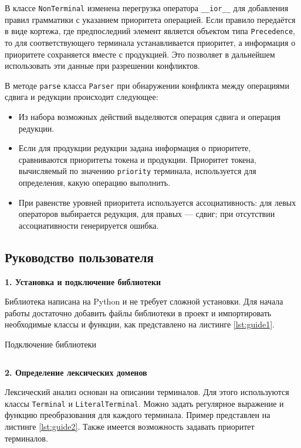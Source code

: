 \documentclass[14pt, russian]{scrartcl}
\begin{document}
В классе \texttt{NonTerminal} изменена перегрузка оператора \texttt{\_\_ior\_\_} для добавления правил
грамматики с указанием приоритета операцией.
Если правило передаётся в виде кортежа, где предпоследний элемент является объектом типа \texttt{Precedence},
то для соответствующего терминала устанавливается приоритет, а информация о приоритете сохраняется вместе с
продукцией. Это позволяет в дальнейшем использовать эти данные при разрешении конфликтов.

В методе \texttt{parse} класса \texttt{Parser} при обнаружении конфликта между операциями сдвига и редукции
происходит следующее:
\begin{itemize}
	\item Из набора возможных действий выделяются операция сдвига и операция редукции.
	\item Если для продукции редукции задана информация о приоритете, сравниваются приоритеты токена и
	продукции. Приоритет токена, вычисляемый по значению \texttt{priority} терминала, используется для
	определения, какую операцию выполнить.
	\item При равенстве уровней приоритета используется ассоциативность: для левых операторов выбирается
	редукция, для правых --- сдвиг; при отсутствии ассоциативности генерируется ошибка.
\end{itemize}


\subsection{Руководство пользователя}

\textbf{1. Установка и подключение библиотеки}

Библиотека написана на Python и не требует сложной установки. Для начала работы достаточно добавить файлы
библиотеки в проект и импортировать необходимые классы и функции, как представлено на листинге \ref{lst:guide1}.

\begin{listing}[H]
	\caption{Подключение библиотеки}
	\label{lst:guide1}
	\inputminted[style=bw, frame=single,fontsize = \footnotesize, linenos=false, xleftmargin = 1.5em]{python}{./listings/guide/1.py}
\end{listing}

\textbf{2. Определение лексических доменов}

Лексический анализ основан на описании терминалов. Для этого используются классы \texttt{Terminal} и
\texttt{LiteralTerminal}. Можно задать регулярное выражение и функцию преобразования для каждого терминала.
Пример представлен на листинге \ref{lst:guide2}. Также имеется возможность задавать приоритет терминалов.
\end{document}
